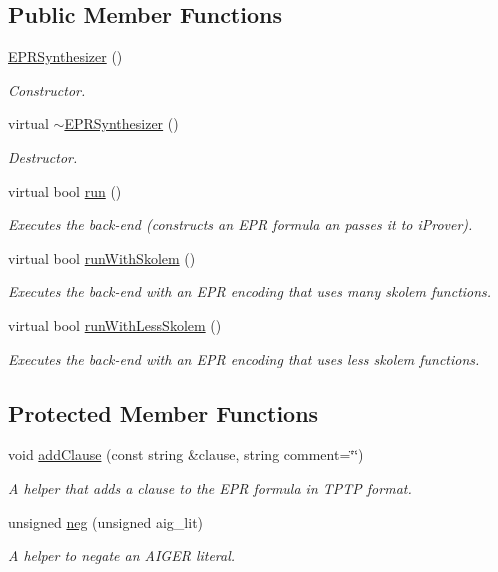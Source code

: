 \subsection*{Public Member Functions}
\begin{DoxyCompactItemize}
\item 
\hyperlink{classEPRSynthesizer_a9798c774af30ce7f82564386f6f32d33}{E\-P\-R\-Synthesizer} ()
\begin{DoxyCompactList}\small\item\em Constructor. \end{DoxyCompactList}\item 
virtual \hyperlink{classEPRSynthesizer_a0299d7f7b8dcc26c13ab0b6268e9f974}{$\sim$\-E\-P\-R\-Synthesizer} ()
\begin{DoxyCompactList}\small\item\em Destructor. \end{DoxyCompactList}\item 
virtual bool \hyperlink{classEPRSynthesizer_ab5eb613a7e5e4f8d408938531f745e4e}{run} ()
\begin{DoxyCompactList}\small\item\em Executes the back-\/end (constructs an E\-P\-R formula an passes it to i\-Prover). \end{DoxyCompactList}\item 
virtual bool \hyperlink{classEPRSynthesizer_ad976438a4577ffaa60f696e1c1c03860}{run\-With\-Skolem} ()
\begin{DoxyCompactList}\small\item\em Executes the back-\/end with an E\-P\-R encoding that uses many skolem functions. \end{DoxyCompactList}\item 
virtual bool \hyperlink{classEPRSynthesizer_ad6e1a2eb75383201277345df5ad566a6}{run\-With\-Less\-Skolem} ()
\begin{DoxyCompactList}\small\item\em Executes the back-\/end with an E\-P\-R encoding that uses less skolem functions. \end{DoxyCompactList}\end{DoxyCompactItemize}
\subsection*{Protected Member Functions}
\begin{DoxyCompactItemize}
\item 
void \hyperlink{classEPRSynthesizer_ab2815225b4bf61a52b8104b19aae6bcf}{add\-Clause} (const string \&clause, string comment=\char`\"{}\char`\"{})
\begin{DoxyCompactList}\small\item\em A helper that adds a clause to the E\-P\-R formula in T\-P\-T\-P format. \end{DoxyCompactList}\item 
unsigned \hyperlink{classEPRSynthesizer_afd429d29479abe7c3f78a232750a0e53}{neg} (unsigned aig\-\_\-lit)
\begin{DoxyCompactList}\small\item\em A helper to negate an A\-I\-G\-E\-R literal. \end{DoxyCompactList}\end{DoxyCompactItemize}
